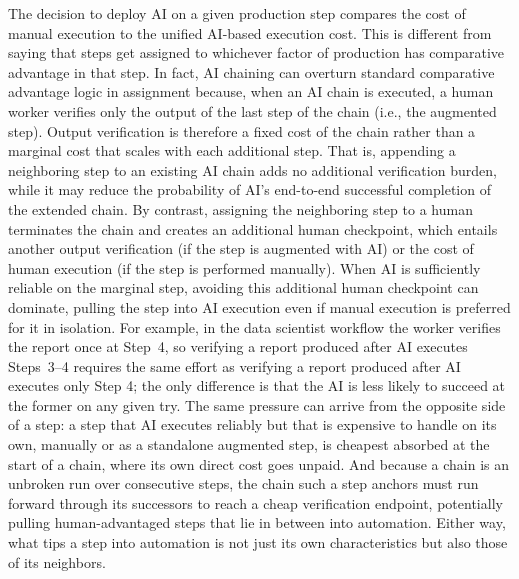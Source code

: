 The decision to deploy AI on a given production step compares the cost of manual execution to the unified AI-based execution cost.
This is different from saying that steps get assigned to whichever factor of production has comparative advantage in that step.
In fact, AI chaining can overturn standard comparative advantage logic in assignment because, when an AI chain is executed, a human worker verifies only the output of the last step of the chain (i.e., the augmented step).
Output verification is therefore a fixed cost of the chain rather than a marginal cost that scales with each additional step.
That is, appending a neighboring step to an existing AI chain adds no additional verification burden, while it may reduce the probability of AI's end-to-end successful completion of the extended chain.
By contrast, assigning the neighboring step to a human terminates the chain and creates an additional human checkpoint, which entails another output verification (if the step is augmented with AI) or the cost of human execution (if the step is performed manually).
When AI is sufficiently reliable on the marginal step, avoiding this additional human checkpoint can dominate, pulling the step into AI execution even if manual execution is preferred for it in isolation.
For example, in the data scientist workflow the worker verifies the report once at Step~4, so verifying a report produced after AI executes Steps~3--4 requires the same effort as verifying a report produced after AI executes only Step 4; the only difference is that the AI is less likely to succeed at the former on any given try.
The same pressure can arrive from the opposite side of a step: a step that AI executes reliably but that is expensive to handle on its own, manually or as a standalone augmented step, is cheapest absorbed at the start of a chain, where its own direct cost goes unpaid.
And because a chain is an unbroken run over consecutive steps, the chain such a step anchors must run forward through its successors to reach a cheap verification endpoint, potentially pulling human-advantaged steps that lie in between into automation.
Either way, what tips a step into automation is not just its own characteristics but also those of its neighbors.

